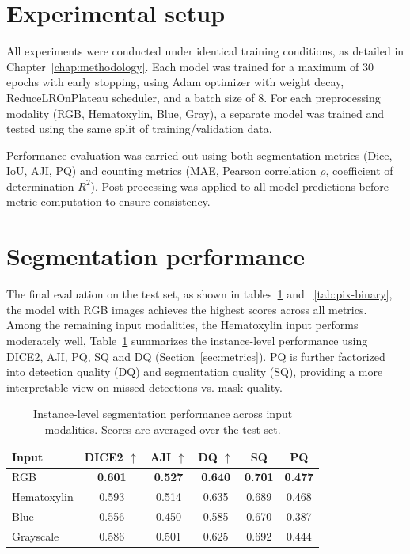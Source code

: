 \documentclass[target=bach,aauheader=,style=]{thud}
\begin{document}
\section{Experimental setup}
All experiments were conducted under identical training conditions, as detailed in Chapter~\ref{chap:methodology}. 
Each model was trained for a maximum of 30 epochs with early stopping, using Adam optimizer with weight decay, ReduceLROnPlateau scheduler, and a batch size of 8. 
For each preprocessing modality (RGB, Hematoxylin, Blue, Gray), a separate model was trained and tested using the same split of training/validation data.

Performance evaluation was carried out using both segmentation metrics (Dice, IoU, AJI, PQ) and counting metrics (MAE, Pearson correlation $\rho$, coefficient of determination $R^2$). 
Post-processing was applied to all model predictions before metric computation to ensure consistency.

\section{Segmentation performance}

The final evaluation on the test set, as shown in tables~\ref{tab:iou-results} and ~\ref{tab:pix-binary}, the model with RGB images achieves the highest scores across all metrics.\\
Among the remaining input modalities, the Hematoxylin input performs moderately well,  
Table~\ref{tab:iou-results}  summarizes the instance-level performance using DICE2, AJI, PQ, SQ and DQ (Section~\ref{sec:metrics}). 
PQ is further factorized into detection quality (DQ) and segmentation quality (SQ), providing a more interpretable view on missed detections vs. mask quality.

\begin{table}[ht]
\centering
\caption{Instance-level segmentation performance across input modalities. Scores are averaged over the test set.}
\label{tab:iou-results}
\small
\begin{tabular}{lccccc}
\toprule
\textbf{Input} & \textbf{DICE2} $\uparrow$ & \textbf{AJI} $\uparrow$ & \textbf{DQ} $\uparrow$ & \textbf{SQ} & \textbf{PQ}\\
\midrule
RGB         & \textbf{0.601} & \textbf{0.527} & \textbf{0.640} & \textbf{0.701} & \textbf{0.477}\\
Hematoxylin & 0.593 & 0.514 & 0.635 & 0.689 & 0.468\\
Blue        & 0.556 & 0.450 & 0.585 & 0.670 & 0.387\\
Grayscale   & 0.586 & 0.501 & 0.625 & 0.692 & 0.444\\
\bottomrule
\end{tabular}
\end{table}
\end{document}

